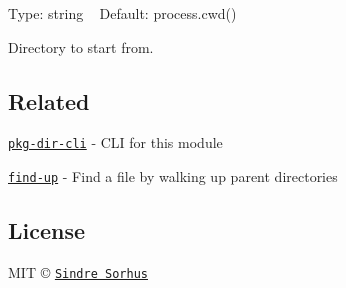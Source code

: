 Type\+: {\ttfamily string} ~\newline
Default\+: {\ttfamily process.\+cwd()}

Directory to start from.

\subsection*{Related}


\begin{DoxyItemize}
\item \href{https://github.com/sindresorhus/pkg-dir-cli}{\tt pkg-\/dir-\/cli} -\/ C\+LI for this module
\item \href{https://github.com/sindresorhus/find-up}{\tt find-\/up} -\/ Find a file by walking up parent directories
\end{DoxyItemize}

\subsection*{License}

M\+IT © \href{http://sindresorhus.com}{\tt Sindre Sorhus} 